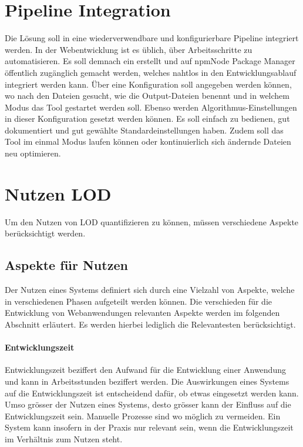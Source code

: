 \section{Pipeline Integration}
Die Lösung soll in eine wiederverwendbare und konfigurierbare Pipeline integriert werden.
In der Webentwicklung ist es üblich, über  Arbeitsschritte zu automatisieren. Es soll demnach ein  erstellt und auf \gls{npm}{Node Package Manager} öffentlich zugänglich gemacht werden, welches nahtlos in den Entwicklungsablauf integriert werden kann. Über eine Konfiguration soll angegeben werden können, wo nach den  Dateien gesucht, wie die Output-Dateien benennt und in welchem Modus das Tool gestartet werden soll. Ebenso werden Algorithmus-Einstellungen in dieser Konfiguration gesetzt werden können. Es soll einfach zu bedienen, gut dokumentiert und gut gewählte Standardeinstellungen haben. Zudem soll das Tool im einmal Modus laufen können oder kontinuierlich sich ändernde Dateien neu optimieren.

\section{Nutzen LOD}
Um den Nutzen von LOD quantifizieren zu können, müssen verschiedene Aspekte berücksichtigt werden.

\subsection{Aspekte für Nutzen}

Der Nutzen eines Systems definiert sich durch eine Vielzahl von Aspekte, welche in verschiedenen Phasen aufgeteilt werden können. Die verschieden für die Entwicklung von Webanwendungen relevanten Aspekte werden im folgenden Abschnitt erläutert. Es werden hierbei lediglich die Relevantesten berücksichtigt.

\paragraph{Entwicklungszeit}

Entwicklungszeit beziffert den Aufwand für die Entwicklung einer Anwendung und kann in Arbeitsstunden beziffert werden.
Die Auswirkungen eines Systems auf die Entwicklungszeit ist entscheidend dafür, ob etwas eingesetzt werden kann. Umso grösser der Nutzen eines Systems, desto grösser kann der Einfluss auf die Entwicklungszeit sein. Manuelle Prozesse sind wo möglich zu vermeiden. Ein System kann insofern in der Praxis nur relevant sein, wenn die Entwicklungszeit im Verhältnis zum Nutzen steht.

